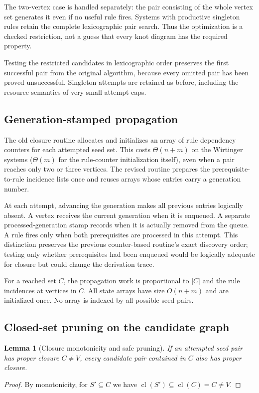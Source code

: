\documentclass[11pt,a4paper]{article}
\newtheorem{lemma}[theorem]{Lemma}
\theoremstyle{definition}\newtheorem{definition}[theorem]{Definition}
\theoremstyle{remark}\newtheorem{remark}[theorem]{Remark}
\newcommand{\cl}{\operatorname{cl}}
\begin{document}
The two-vertex case is handled separately: the pair consisting of the
whole vertex set generates it even if no useful rule fires. Systems with
productive singleton rules retain the complete lexicographic pair search.
Thus the optimization is a checked restriction, not a guess that every
knot diagram has the required property.

Testing the restricted candidates in lexicographic order preserves the
first successful pair from the original algorithm, because every omitted
pair has been proved unsuccessful. Singleton attempts are retained as
before, including the resource semantics of very small attempt caps.

\subsection{Generation-stamped propagation}

The old closure routine allocates and initializes an array of rule
dependency counters for each attempted seed set. This costs $\Theta(n+m)$
on the Wirtinger systems ($\Theta(m)$ for the rule-counter initialization
itself), even when a pair reaches only two or three vertices. The revised routine
prepares the prerequisite-to-rule incidence lists once and reuses arrays
whose entries carry a generation number.

At each attempt, advancing the generation makes all previous entries
logically absent. A vertex receives the current generation when it is
enqueued. A separate processed-generation stamp records when it is actually
removed from the queue. A rule fires only when both prerequisites are
processed in this attempt. This distinction preserves the previous
counter-based routine's exact discovery order; testing only whether
prerequisites had been enqueued would be logically adequate for closure
but could change the derivation trace.

For a reached set $C$, the propagation work is proportional to $|C|$ and
the rule incidences at vertices in $C$. All state arrays have size $O(n+m)$
and are initialized once. No array is indexed by all possible seed pairs.

\subsection{Closed-set pruning on the candidate graph}

\begin{lemma}[Closure monotonicity and safe pruning]\label{lem:prune}
If an attempted seed pair has proper closure $C\neq V$, every candidate
pair contained in $C$ also has proper closure.
\end{lemma}
\begin{proof}
By monotonicity, for $S'\subseteq C$ we have
$\cl(S')\subseteq\cl(C)=C\neq V$.
\end{proof}
\end{document}
